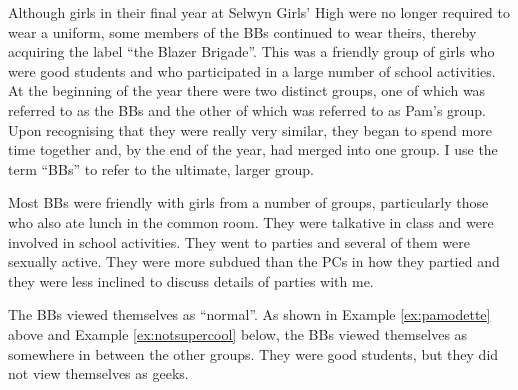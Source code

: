 \vspace{5 mm}
 
\noindent Although girls in their final year at Selwyn Girls' High were no longer required to wear a uniform, some members of the BBs continued to wear theirs, thereby acquiring the label ``the Blazer Brigade''.  This was a friendly group of girls who were good students and who participated in a large number of school activities.  At the beginning of the year there were two distinct groups, one of which was referred to as the BBs and the other of which was referred to as Pam's group.  Upon recognising that they were really very similar, they began to spend more time together and, by the end of the year, had merged into one group.  I use the term ``BBs'' to refer to the ultimate, larger group.  



Most BBs were friendly with girls from a number of groups, particularly those who also ate lunch in the common room.  They were talkative in class and were involved in school activities.  They went to parties and several of them were sexually active.  They were more subdued than the PCs in how they partied and they were less inclined to discuss details of parties with me.  

The BBs viewed themselves as ``normal''.  As shown in Example \ref{ex:pamodette} above and Example \ref{ex:notsupercool} below, the BBs viewed themselves as somewhere in between the other groups.  They were good students, but they did not view themselves as geeks.

\label{ex:notsupercool}

